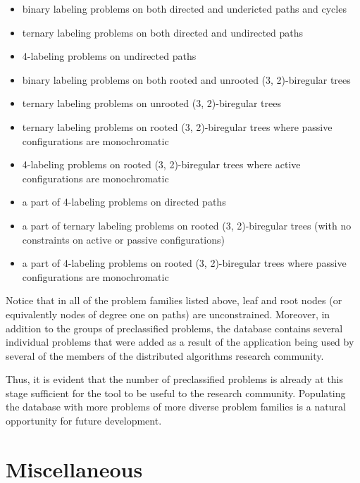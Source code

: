 \begin{itemize}
  \item binary labeling problems on both directed and undericted paths and cycles
  \item ternary labeling problems on both directed and undirected paths
  \item 4-labeling problems on undirected paths
  \item binary labeling problems on both rooted and unrooted (3, 2)-biregular trees
  \item ternary labeling problems on unrooted (3, 2)-biregular trees
  \item ternary labeling problems on rooted (3, 2)-biregular trees where passive configurations are monochromatic
  \item 4-labeling problems on rooted (3, 2)-biregular trees where active configurations are monochromatic
  \item a part of 4-labeling problems on directed paths
  \item a part of ternary labeling problems on rooted (3, 2)-biregular trees (with no constraints on active or passive configurations)
  \item a part of 4-labeling problems on rooted (3, 2)-biregular trees where passive configurations are monochromatic
\end{itemize}
Notice that in all of the problem families listed above, leaf and root nodes
(or equivalently nodes of degree one on paths) are unconstrained. Moreover, in addition to the
groups of preclassified problems, the database contains several individual problems that
were added as a result of the application being used by several of the members of the
distributed algorithms research community.

Thus, it is evident that the number of preclassified problems is already at this stage sufficient
for the tool to be useful to the research community. Populating the database
with more problems of more diverse problem families is a natural opportunity for future
development.

\section{Miscellaneous}
